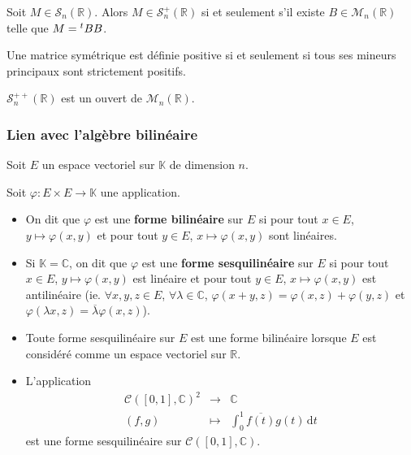 	\begin{corollary}
		Soit $M \in \mathcal{S}_n(\mathbb{R})$. Alors $M \in \mathcal{S}_n^+(\mathbb{R})$ si et seulement s'il existe $B \in \mathcal{M}_n(\mathbb{R})$ telle que $M = \mathstrut ^t BB$.
	\end{corollary}
	
	\begin{theorem}
		Une matrice symétrique est définie positive si et seulement si tous ses mineurs principaux sont strictement positifs.
	\end{theorem}
	
	\begin{corollary}
		$\mathcal{S}_n^{++}(\mathbb{R})$ est un ouvert de $\mathcal{M}_n(\mathbb{R})$.
	\end{corollary}
	
	\subsubsection{Lien avec l'algèbre bilinéaire}
	
	
	Soit $E$ un espace vectoriel sur $\mathbb{K}$ de dimension $n$.
	
	\begin{definition}
		Soit $\varphi : E \times E \rightarrow \mathbb{K}$ une application.
		\begin{itemize}
			\item On dit que $\varphi$ est une \textbf{forme bilinéaire} sur $E$ si pour tout $x \in E$, $y \mapsto \varphi(x, y)$ et pour tout $y \in E$, $x \mapsto \varphi(x, y)$ sont linéaires.
			\item Si $\mathbb{K} = \mathbb{C}$, on dit que $\varphi$ est une \textbf{forme sesquilinéaire} sur $E$ si pour tout $x \in E$, $y \mapsto \varphi(x, y)$ est linéaire et pour tout $y \in E$, $x \mapsto \varphi(x, y)$ est antilinéaire (ie. $\forall x, y, z \in E$, $\forall \lambda \in \mathbb{C}$, $\varphi(x+y, z) = \varphi(x,z) + \varphi(y,z)$ et $\varphi(\lambda x, z) = \overline{\lambda} \varphi(x,z)$).
		\end{itemize}
	\end{definition}
	
	\begin{example}
		\begin{itemize}
			\item Toute forme sesquilinéaire sur $E$ est une forme bilinéaire lorsque $E$ est considéré comme un espace vectoriel sur $\mathbb{R}$.
			\item L'application
			\[
				\begin{array}{ccc}
					\mathcal{C}([0,1], \mathbb{C})^2 &\rightarrow& \mathbb{C} \\
					(f,g) &\mapsto& \int_0^1 \overline{f(t)} g(t) \, \mathrm{d}t
				\end{array}
			\]
			est une forme sesquilinéaire sur $\mathcal{C}([0,1], \mathbb{C})$.
		\end{itemize}
	\end{example}
	
